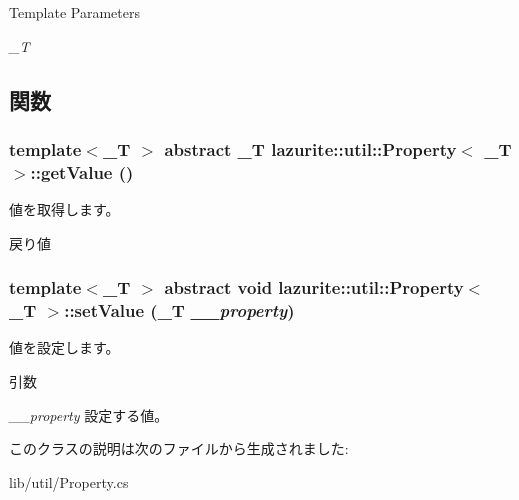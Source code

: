\begin{DoxyTemplParams}{Template Parameters}
\item[{\em \_\-T}]\end{DoxyTemplParams}


\subsection{関数}
\hypertarget{classlazurite_1_1util_1_1_property_3_01___t_01_4_a434077d787020d0b4f9754713495f0b0}{
\subsubsection[{getValue}]{\setlength{\rightskip}{0pt plus 5cm}template$<$\_\-T $>$ abstract \_\-T lazurite::util::Property$<$ \_\-T $>$::getValue ()}}
\label{classlazurite_1_1util_1_1_property_3_01___t_01_4_a434077d787020d0b4f9754713495f0b0}


値を取得します。 \begin{DoxyReturn}{戻り値}

\end{DoxyReturn}
\hypertarget{classlazurite_1_1util_1_1_property_3_01___t_01_4_a3f1f7cb7df540b368296433279caae71}{
\subsubsection[{setValue}]{\setlength{\rightskip}{0pt plus 5cm}template$<$\_\-T $>$ abstract void lazurite::util::Property$<$ \_\-T $>$::setValue (\_\-T {\em \_\-\_\-property})}}
\label{classlazurite_1_1util_1_1_property_3_01___t_01_4_a3f1f7cb7df540b368296433279caae71}


値を設定します。 
\begin{DoxyParams}{引数}
\item[{\em \_\-\_\-property}]設定する値。\end{DoxyParams}


このクラスの説明は次のファイルから生成されました:\begin{DoxyCompactItemize}
\item 
lib/util/Property.cs\end{DoxyCompactItemize}
